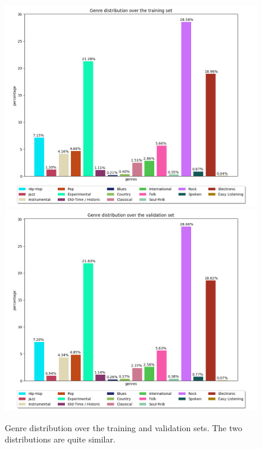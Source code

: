 \begin{figure}
	\centering
	\includegraphics[width=1.0\textwidth]{images/train.png}
	\includegraphics[width=1.0\textwidth]{images/val.png}
	\caption{Genre distribution over the training and validation
	sets. The two distributions are quite similar.}
	\label{trainval}
\end{figure}